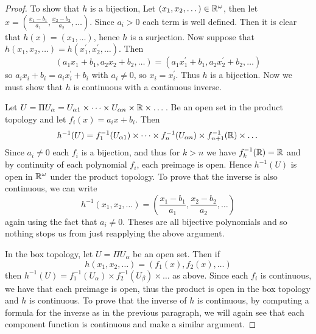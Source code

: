     \question 

    \begin{proof}
        To show that $h$ is a bijection, Let $(x_1, x_2, \dots) \in \mathbb{R}^\omega$, then let $x = (\frac{x_1 - b_1}{a_1}, \frac{x_2-b_2}{a_2}, \dots)$. Since $a_i > 0$ each term is well defined. Then it is clear that $h(x) = (x_1, \dots)$, hence 
        $h$ is a surjection. Now suppose that $h(x_1, x_2, \dots) = h(x_1^\prime, x_2^\prime, \dots)$. Then 
        \[(a_1x_1 + b_1, a_2x_2 + b_2, \dots) = (a_1x_1^\prime + b_1, a_2x_2^\prime + b_2, \dots)\]
        so $a_ix_i + b_i = a_ix_i^\prime + b_i$ with $a_i \neq 0$, so $x_i = x_i^\prime$. Thus $h$ is a bijection. 
        Now we must show that $h$ is continuous with a continuous inverse. 
        
        Let $U = \Pi U_\alpha = U_{\alpha 1} \times \dots \times  U_{\alpha n} \times \mathbb{R} \times \dots$. Be an open set in 
        the product topology and let $f_i(x) = a_i x + b_i$. Then 
        \[h^{-1}(U) = f^{-1}_1(U_{\alpha 1}) \times \dots \times f^{-1}_n(U_{\alpha n}) \times f^{-1}_{n+1}(\mathbb{R}) \times \dots\]
        Since $a_i \neq 0$ each $f_i$ is a bijection, and thus for $k > n$ we have $f^{-1}_k(\mathbb{R}) = \mathbb{R}$ and 
        by continuity of each polynomial $f_i$, each preimage is open. Hence $h^{-1}(U)$ is open in $\mathbb{R}^\omega$ under the product topology. 
        To prove that the inverse is also continuous, we can write 
        \[h^{-1}(x_1, x_2, \dots) = \left(\frac{x_1 - b_1}{a_1}, \frac{x_2 - b_2}{a_2}, \dots \right)\]
        again using the fact that $a_i \neq 0$. Theses are all bijective polynomials and so nothing stops us from just 
        reapplying the above argument. 


        In the box topology, let $U = \Pi U_\alpha$ be an open set. Then if 
        \[h(x_1, x_2, \dots ) = (f_1(x), f_2(x), \dots )\]
        then $h^{-1}(U) = f^{-1}_1(U_\alpha) \times f_2^{-1}(U_\beta) \times \dots $ as above.
        Since each $f_i$ is continuous, we have that each preimage is open, thus the product is open in the box topology 
        and $h$ is continuous. To prove that the inverse of $h$ is continuous, by computing a formula for the inverse 
        as in the previous paragraph, we will again see that each component function is continuous and make a similar argument. 
    \end{proof}

   


